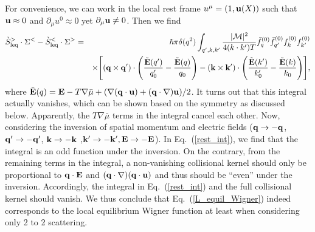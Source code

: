 \documentclass[aps,prd,showkeys,preprint,amsmath,amssymb,nofootinbib]{revtex4-1}
\begin{document}
For convenience, we can work in the local rest frame $u^{\mu}=(1, {\bf u}(X))$ such that ${\bf u}\approx 0$ and $\partial_{\mu}u^0\approx 0$ yet $\partial_{\mu}{\bf u}\neq 0$. Then we find
\begin{eqnarray}\nonumber\label{rest_int}
\grave{S}_{\text{leq}}^{>}\cdot\Sigma^<-\grave{S}_{\text{leq}}^{<}\cdot\Sigma^>
&=&\hbar\pi\delta(q^2)\int_{q',k,k'}
\frac{|\mathcal{M}|^2}{4(k\cdot k')T}\bar{f}^{(0)}_q\bar{f}^{(0)}_{q'}f^{(0)}_kf^{(0)}_{k'}
\\
&&\times
\Bigg[({\bf q\times q'})\cdot\Bigg(\frac{\tilde{\bf E}(q')}{q'_0}-\frac{\tilde{\bf E}(q)}{q_0}\Bigg)-({\bf k\times k'})\cdot\Bigg(\frac{\tilde{\bf E}(k')}{k'_0}-\frac{\tilde{\bf E}(k)}{k_0}\Bigg)\Bigg],
\end{eqnarray}
where $\tilde{\bf E}(q)={\bf E}-T\nabla\bar{\mu}+(\nabla({\bf q\cdot u})+({\bf q\cdot \nabla}){\bf u})/2$. It turns out that this integral actually vanishes, which can be shown based on the symmetry as discussed below. Apparently, the $T\nabla\bar{\mu}$ terms in the integral cancel each other. Now, considering the inversion of spatial momentum and electric fields
(${\bf q}\rightarrow-{\bf q}$, ${\bf q'}\rightarrow-{\bf q'}$, ${\bf k}\rightarrow-{\bf k}$ ,${\bf k'}\rightarrow-{\bf k'},{\bf E}\rightarrow -{\bf E}$). In Eq.~(\ref{rest_int}), we find that the integral is an odd function under the inversion. On the contrary, from the remaining terms in the integral, a non-vanishing collisional kernel should only be proportional to ${\bf q}\cdot\mathcal{\bf E}$ and $({\bf q\cdot \nabla})({\bf q\cdot u})$ and thus should be ``even'' under the inversion.   Accordingly, the integral in Eq.~(\ref{rest_int}) and the full collisional kernel should vanish. We thus conclude that Eq.~(\ref{L_equil_Wigner}) indeed corresponds to the local equilibrium Wigner function at least when considering only 2 to 2 scattering.  

\end{document}
